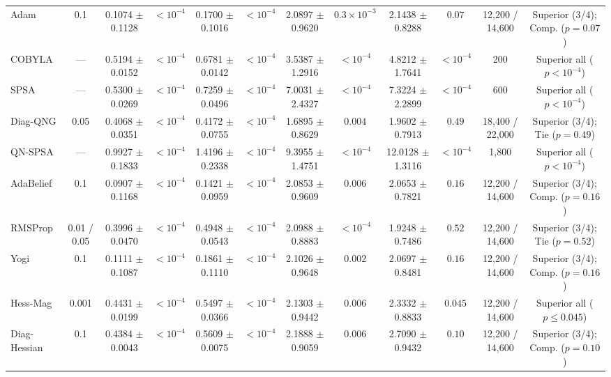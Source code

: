 \documentclass[11pt,a4paper]{article}
\begin{document}
\begin{table}[t]
{\begin{tabular}{lccccccccccc}
Adam & 0.1 & 0.1074 $\pm$ 0.1128 & $< 10^{-4}$ & 0.1700 $\pm$ 0.1016 & $< 10^{-4}$ & 2.0897 $\pm$ 0.9620 & $0.3 \times 10^{-3}$ & 2.1438 $\pm$ 0.8288 & $0.07$ & 12,200 / 14,600 & Superior (3/4); Comp. ($p=0.07$) \\
COBYLA & --- & 0.5194 $\pm$ 0.0152 & $< 10^{-4}$ & 0.6781 $\pm$ 0.0142 & $< 10^{-4}$ & 3.5387 $\pm$ 1.2916 & $< 10^{-4}$ & 4.8212 $\pm$ 1.7641 & $< 10^{-4}$ & 200 & Superior all ($p < 10^{-4}$) \\
SPSA & --- & 0.5300 $\pm$ 0.0269 & $< 10^{-4}$ & 0.7259 $\pm$ 0.0496 & $< 10^{-4}$ & 7.0031 $\pm$ 2.4327 & $< 10^{-4}$ & 7.3224 $\pm$ 2.2899 & $< 10^{-4}$ & 600 & Superior all ($p < 10^{-4}$) \\
Diag-QNG & 0.05 & 0.4068 $\pm$ 0.0351 & $< 10^{-4}$ & 0.4172 $\pm$ 0.0755 & $< 10^{-4}$ & 1.6895 $\pm$ 0.8629 & $0.004$ & 1.9602 $\pm$ 0.7913 & $0.49$ & 18,400 / 22,000 & Superior (3/4); Tie ($p=0.49$) \\
QN-SPSA & --- & 0.9927 $\pm$ 0.1833 & $< 10^{-4}$ & 1.4196 $\pm$ 0.2338 & $< 10^{-4}$ & 9.3955 $\pm$ 1.4751 & $< 10^{-4}$ & 12.0128 $\pm$ 1.3116 & $< 10^{-4}$ & 1,800 & Superior all ($p < 10^{-4}$) \\
AdaBelief & 0.1 & 0.0907 $\pm$ 0.1168 & $< 10^{-4}$ & 0.1421 $\pm$ 0.0959 & $< 10^{-4}$ & 2.0853 $\pm$ 0.9609 & $0.006$ & 2.0653 $\pm$ 0.7821 & $0.16$ & 12,200 / 14,600 & Superior (3/4); Comp. ($p=0.16$) \\
RMSProp & 0.01 / 0.05 & 0.3996 $\pm$ 0.0470 & $< 10^{-4}$ & 0.4948 $\pm$ 0.0543 & $< 10^{-4}$ & 2.0988 $\pm$ 0.8883 & $< 10^{-4}$ & 1.9248 $\pm$ 0.7486 & $0.52$ & 12,200 / 14,600 & Superior (3/4); Tie ($p=0.52$) \\
Yogi & 0.1 & 0.1111 $\pm$ 0.1087 & $< 10^{-4}$ & 0.1861 $\pm$ 0.1110 & $< 10^{-4}$ & 2.1026 $\pm$ 0.9648 & $0.002$ & 2.0697 $\pm$ 0.8481 & $0.16$ & 12,200 / 14,600 & Superior (3/4); Comp. ($p=0.16$) \\
Hess-Mag & 0.001 & 0.4431 $\pm$ 0.0199 & $< 10^{-4}$ & 0.5497 $\pm$ 0.0366 & $< 10^{-4}$ & 2.1303 $\pm$ 0.9442 & $0.006$ & 2.3332 $\pm$ 0.8833 & $0.045$ & 12,200 / 14,600 & Superior all ($p \le 0.045$) \\
Diag-Hessian & 0.1 & 0.4384 $\pm$ 0.0043 & $< 10^{-4}$ & 0.5609 $\pm$ 0.0075 & $< 10^{-4}$ & 2.1888 $\pm$ 0.9059 & $0.006$ & 2.7090 $\pm$ 0.9432 & $0.10$ & 12,200 / 14,600 & Superior (3/4); Comp. ($p=0.10$) \\
\bottomrule
\end{tabular}%
}
\end{table}
\end{document}
